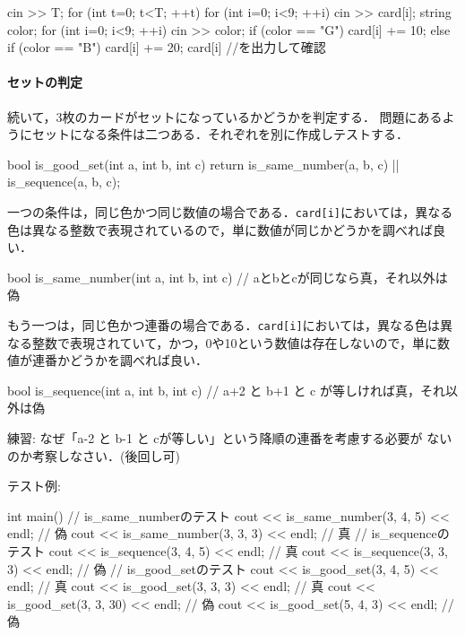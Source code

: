 \begin{cbox}
    cin >> T;
    for (int t=0; t<T; ++t) {
        for (int i=0; i<9; ++i) {
          cin >> card[i];
        }
        string color;
        for (int i=0; i<9; ++i) {
          cin >> color;
            if (color == "G") card[i] += 10;
            else if (color == "B") card[i] += 20;
          card[i] //を出力して確認
        }
    }
\end{cbox}

\paragraph{セットの判定}

続いて，3枚のカードがセットになっているかどうかを判定する．
問題にあるようにセットになる条件は二つある．それぞれを別に作成しテストする．

\begin{cbox}
bool is_good_set(int a, int b, int c) {
  return is_same_number(a, b, c) || is_sequence(a, b, c);
}    
\end{cbox}

一つの条件は，同じ色かつ同じ数値の場合である．\texttt{card[i]}においては，異なる色は異なる整数で表現されているので，単に数値が同じかどうかを調べれば良い．

\begin{cbox}
bool is_same_number(int a, int b, int c) {
  // aとbとcが同じなら真，それ以外は偽
}    
\end{cbox}

もう一つは，同じ色かつ連番の場合である．\texttt{card[i]}においては，異なる色は異なる整数で表現されていて，かつ，0や10という数値は存在しないので，単に数値が連番かどうかを調べれば良い．

\begin{cbox}
bool is_sequence(int a, int b, int c) {
  // a+2 と b+1 と c が等しければ真，それ以外は偽
}    
\end{cbox}

練習: なぜ「a-2 と b-1 と cが等しい」という降順の連番を考慮する必要が
ないのか考察しなさい．(後回し可)

テスト例:

\begin{cbox}
int main() {
  // is\_same\_numberのテスト
  cout << is_same_number(3, 4, 5) << endl; // 偽
  cout << is_same_number(3, 3, 3) << endl; // 真
  // is\_sequenceのテスト
  cout << is_sequence(3, 4, 5) << endl; // 真
  cout << is_sequence(3, 3, 3) << endl; // 偽
  // is\_good\_setのテスト
  cout << is_good_set(3, 4, 5) << endl;  // 真
  cout << is_good_set(3, 3, 3) << endl;  // 真
  cout << is_good_set(3, 3, 30) << endl; // 偽
  cout << is_good_set(5, 4, 3) << endl;  // 偽
}
\end{cbox}


